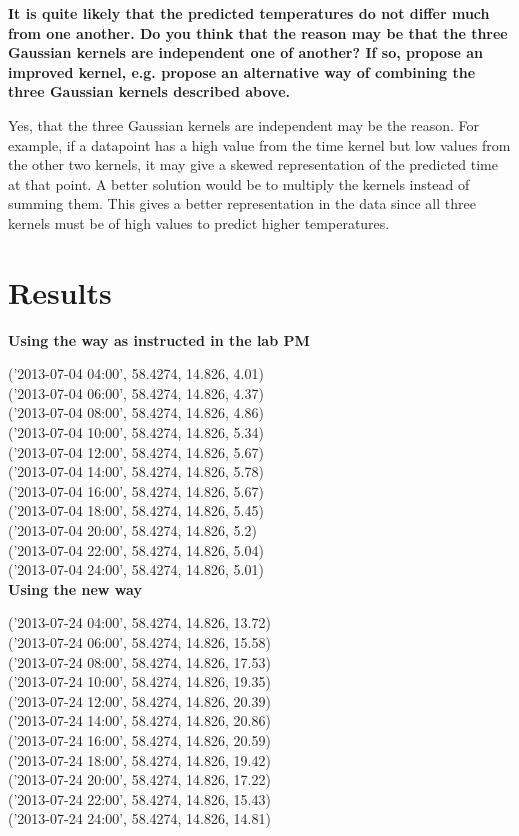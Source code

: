 \documentclass[a4paper,titlepage,12pt]{article}
\begin{document}
\textbf{It is quite likely that the predicted temperatures do not differ much from one another. Do you think that the reason may be that the three Gaussian kernels are independent one of another? If so, propose an improved kernel, e.g. propose an alternative way of combining the three Gaussian kernels described above.}

Yes, that the three Gaussian kernels are independent may be the reason. For
example, if a datapoint has a high value from the time kernel but low values
from the other two kernels, it may give a skewed representation of the predicted
time at that point. A better solution would be to multiply the kernels instead
of summing them. This gives a better representation in the data since all three
kernels must be of high values to predict higher temperatures. 

\section{Results}

\textbf{Using the way as instructed in the lab PM}

('2013-07-04 04:00', 58.4274, 14.826, 4.01) \\
('2013-07-04 06:00', 58.4274, 14.826, 4.37) \\
('2013-07-04 08:00', 58.4274, 14.826, 4.86) \\
('2013-07-04 10:00', 58.4274, 14.826, 5.34) \\
('2013-07-04 12:00', 58.4274, 14.826, 5.67) \\
('2013-07-04 14:00', 58.4274, 14.826, 5.78) \\
('2013-07-04 16:00', 58.4274, 14.826, 5.67) \\
('2013-07-04 18:00', 58.4274, 14.826, 5.45) \\
('2013-07-04 20:00', 58.4274, 14.826, 5.2) \\
('2013-07-04 22:00', 58.4274, 14.826, 5.04) \\
('2013-07-04 24:00', 58.4274, 14.826, 5.01) \\

\textbf{Using the new way}

('2013-07-24 04:00', 58.4274, 14.826, 13.72) \\
('2013-07-24 06:00', 58.4274, 14.826, 15.58) \\
('2013-07-24 08:00', 58.4274, 14.826, 17.53) \\
('2013-07-24 10:00', 58.4274, 14.826, 19.35) \\
('2013-07-24 12:00', 58.4274, 14.826, 20.39) \\
('2013-07-24 14:00', 58.4274, 14.826, 20.86) \\
('2013-07-24 16:00', 58.4274, 14.826, 20.59) \\
('2013-07-24 18:00', 58.4274, 14.826, 19.42) \\
('2013-07-24 20:00', 58.4274, 14.826, 17.22) \\
('2013-07-24 22:00', 58.4274, 14.826, 15.43) \\
('2013-07-24 24:00', 58.4274, 14.826, 14.81) \\
\end{document}
